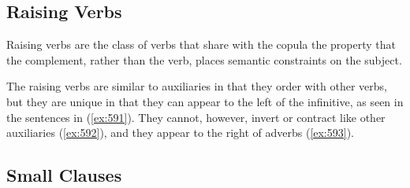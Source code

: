 \beginsentences
{}\label{ex:587} 
\label{ex:588} 
\endsentences

 
 
\subsection{Raising Verbs} 
\label{raising-verbs} 
 
Raising verbs are the class of verbs that share with the copula the property 
that the complement, rather than the verb, places semantic constraints on 
the subject.  
 
\beginsentences
{}\label{ex:589} 
\endsentences

 
\beginsentences
{}\label{ex:590} 
\endsentences

 
The raising verbs are similar to auxiliaries in that they order with other 
verbs, but they are unique in that they can appear to the left of the 
infinitive, as seen in the sentences in ({\ref{ex:591}}).  They cannot, however, 
invert or contract like other auxiliaries ({\ref{ex:592}}), and they appear to the 
right of adverbs ({\ref{ex:593}}). 
 
\beginsentences
{}\label{ex:591} 
\endsentences

 
\beginsentences
{}\label{ex:592} 
\endsentences

 
\beginsentences
{}\label{ex:593} 
\endsentences

 
 
\subsection{Small Clauses} 
 
